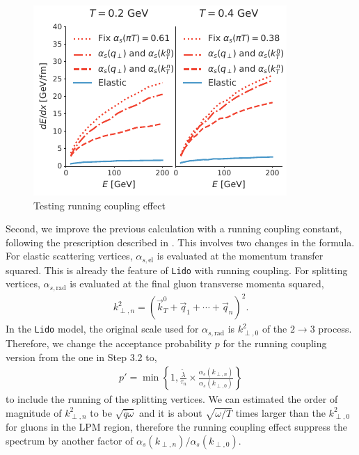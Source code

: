 \documentclass[aps, prc, reprint, amsmath, groupedaddress, nofootinbib]{revtex4-1}
\begin{document}
\begin{figure}
\includegraphics[width=\columnwidth]{Eloss_infinite_run.pdf}
\caption{Testing running coupling effect }
\label{fig:run}
\end{figure}
Second, we improve the previous calculation with a running coupling constant, following the prescription described in \cite{Arnold:2008zu}.
This involves two changes in the formula. 
For elastic scattering vertices, $\alpha_{s, \textrm{el}}$ is evaluated at the momentum transfer squared. 
This is already the feature of {\tt Lido} with running coupling.
For splitting vertices,  $\alpha_{s, \textrm{rad}}$ is evaluated at the final gluon transverse momenta squared,
\begin{eqnarray}\label{eq:kTn}
k_{\perp,n}^2 = \left(\vec{k}_T^0+\vec{q}_1+\cdots+\vec{q}_n\right)^2.
\end{eqnarray} 
In the {\tt Lido} model, the original scale used for $\alpha_{s, \textrm{rad}}$ is $k_{\perp,0}^2$ of the $2\rightarrow 3$ process.
Therefore, we change the acceptance probability $p$ for the running coupling version from the one in Step 3.2 to,
\begin{eqnarray}
p' = \min\left\{1, \frac{\tilde{\lambda}}{\tau_n}\times\frac{\alpha_s(k_{\perp,n})}{\alpha_s(k_{\perp,0})}\right\}
\end{eqnarray}
to include the running of the splitting vertices.
We can estimated the order of magnitude of $k_{\perp,n}^2$ to be $\sqrt{\hat{q}\omega}$ and it is about $\sqrt{\omega/T}$ times larger than the $k_{\perp,0}^2$ for gluons in the LPM region, therefore the running coupling effect suppress the spectrum by another factor of $\alpha_s(k_{\perp,n})/\alpha_s(k_{\perp,0})$.
\end{document}
